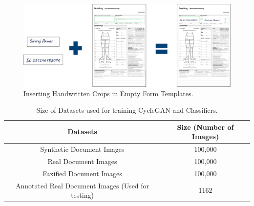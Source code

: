 \begin{figure}[H]
        \begin{center}
	    \includegraphics[scale=0.40]{images/InsertHandwrittenCrops.png}
	    \caption{Inserting Handwritten Crops in Empty Form Templates.}
	    \label{fig:InsertHandwrittenCrops}
	    \end{center}
\end{figure}


\begin{center}
    \begin{table}[H]
    \begin{center}
    \begin{tabular}{||c c||} 
    \hline
    \textbf{Datasets} & \textbf{Size (Number of Images)}\\ [0.5ex] 
    \hline\hline
    Synthetic Document Images & 100,000 \\ 
    \hline
    Real Document Images & 100,000 \\
    \hline
    Faxified Document Images & 100,000 \\
    \hline
    Annotated Real Document Images (Used for testing) & 1162 \\
    \hline
    \end{tabular}
    \end{center}
    \caption{Size of Datasets used for training \ac{CycleGAN} and Classifiers.}
    \label{table:datasets}
    \end{table}
\end{center}

